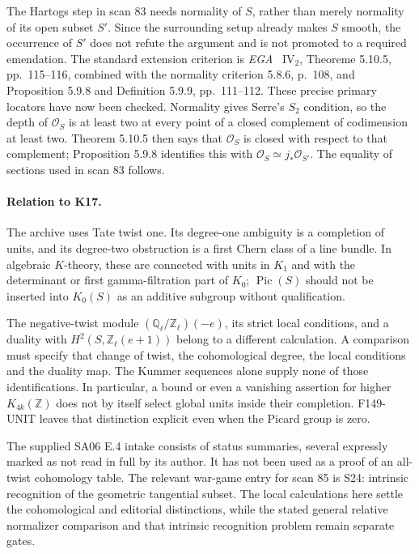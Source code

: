 The Hartogs step in scan 83 needs normality of \(S\), rather than
merely normality of its open subset \(S'\).  Since the surrounding
setup already makes \(S\) smooth, the occurrence of \(S'\) does not
refute the argument and is not promoted to a required emendation.
The standard extension criterion is \emph{EGA}~\cite{EGAIV2}
\(\mathrm{IV}_2\), Theoreme 5.10.5, pp.~115--116, combined with
the normality criterion 5.8.6, p.~108, and Proposition 5.9.8 and
Definition 5.9.9, pp.~111--112.  These precise primary locators have
now been checked.  Normality gives Serre's \(S_2\) condition, so
the depth of \(\mathcal O_S\) is at least two at every point of a
closed complement of codimension at least two.  Theorem 5.10.5
then says that \(\mathcal O_S\) is closed with respect to that
complement; Proposition 5.9.8 identifies this with
\(\mathcal O_S\simeq j_*\mathcal O_{S'}\).
The equality of sections used in scan 83 follows.

\paragraph{Relation to K17.}
The archive uses Tate twist one.  Its degree-one ambiguity is a
completion of units, and its degree-two obstruction is a first Chern
class of a line bundle.  In algebraic \(K\)-theory, these are connected
with units in \(K_1\) and with the determinant or first
gamma-filtration part of \(K_0\); \(\operatorname{Pic}(S)\) should
not be inserted into \(K_0(S)\) as an additive subgroup without
qualification.

The negative-twist module
\((\mathbb Q_\ell/\mathbb Z_\ell)(-e)\), its strict local conditions,
and a duality with \(H^2(S,\mathbb Z_\ell(e+1))\) belong to a
different calculation.  A comparison must specify that change of
twist, the cohomological degree, the local conditions and the duality
map.  The Kummer sequences alone supply none of those identifications.
In particular, a bound or even a vanishing assertion for higher
\(K_{4k}(\mathbb Z)\) does not by itself select global units inside
their completion.  F149-UNIT leaves that distinction explicit even
when the Picard group is zero.

The supplied SA06 E.4 intake consists of status summaries, several
expressly marked as not read in full by its author.  It has not been
used as a proof of an all-twist cohomology table.  The relevant
war-game entry for scan 85 is S24: intrinsic recognition of the
geometric tangential subset.  The local calculations here settle the
cohomological and editorial distinctions, while the stated general
relative normalizer comparison and that intrinsic recognition problem
remain separate gates.
